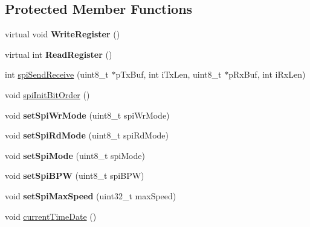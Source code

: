 \subsection*{Protected Member Functions}
\begin{DoxyCompactItemize}
\item 
\hypertarget{classspi_a01ec3f79a14b29cee3fed591c477ecc4}{virtual void {\bfseries Write\-Register} ()}\label{classspi_a01ec3f79a14b29cee3fed591c477ecc4}

\item 
\hypertarget{classspi_ab82db7e47c0788f8593c0213688043cd}{virtual int {\bfseries Read\-Register} ()}\label{classspi_ab82db7e47c0788f8593c0213688043cd}

\item 
int \hyperlink{classspi_ace5d4b909ab9a103ae676df30db26836}{spi\-Send\-Receive} (uint8\-\_\-t $\ast$p\-Tx\-Buf, int i\-Tx\-Len, uint8\-\_\-t $\ast$p\-Rx\-Buf, int i\-Rx\-Len)
\item 
void \hyperlink{classspi_ab1569afd18aaa3ecaacc5252dab1177c}{spi\-Init\-Bit\-Order} ()
\item 
\hypertarget{classspi_a911578bfdd06fb5a4572069213072e53}{void {\bfseries set\-Spi\-Wr\-Mode} (uint8\-\_\-t spi\-Wr\-Mode)}\label{classspi_a911578bfdd06fb5a4572069213072e53}

\item 
\hypertarget{classspi_aea783dd071bb43a6cd05bc9cf4acb0d4}{void {\bfseries set\-Spi\-Rd\-Mode} (uint8\-\_\-t spi\-Rd\-Mode)}\label{classspi_aea783dd071bb43a6cd05bc9cf4acb0d4}

\item 
\hypertarget{classspi_aeb466902f0246e674230656c36260417}{void {\bfseries set\-Spi\-Mode} (uint8\-\_\-t spi\-Mode)}\label{classspi_aeb466902f0246e674230656c36260417}

\item 
\hypertarget{classspi_a0ca79e4dfeb0520519aae82576881229}{void {\bfseries set\-Spi\-B\-P\-W} (uint8\-\_\-t spi\-B\-P\-W)}\label{classspi_a0ca79e4dfeb0520519aae82576881229}

\item 
\hypertarget{classspi_a00c5efd63b774a1d50d3e69c8a49e0fa}{void {\bfseries set\-Spi\-Max\-Speed} (uint32\-\_\-t max\-Speed)}\label{classspi_a00c5efd63b774a1d50d3e69c8a49e0fa}

\item 
void \hyperlink{classspi_a71d243d92efaea106a3ee14970ea5ebe}{current\-Time\-Date} ()
\end{DoxyCompactItemize}
